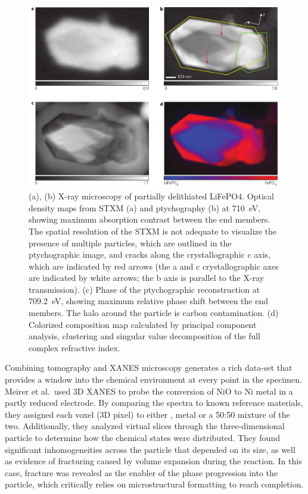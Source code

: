 \documentclass[journal=cmatex,manuscript=perspective]{achemso}
\begin{document}
\begin{figure}
  \includegraphics[width=\textwidth]{shapiro2014-2.png}
  \caption{(a), (b) X-ray microscopy of partially delithiated
    LiFePO4. Optical density maps from STXM (a) and ptychography (b)
    at \SI{710}{eV}, showing maximum absorption contrast between the end
    members. The spatial resolution of the STXM is not adequate to
    visualize the presence of multiple particles, which are outlined
    in the ptychographic image, and cracks along the crystallographic
    c axis, which are indicated by red arrows (the a and c
    crystallographic axes are indicated by white arrows; the b axis is
    parallel to the X-ray transmission). (c) Phase of the
    ptychographic reconstruction at \SI{709.2}{eV}, showing maximum relative
    phase shift between the end members. The halo around the particle
    is carbon contamination. (d) Colorized composition map calculated
    by principal component analysis, clustering and singular value
    decomposition of the full complex refractive index.\cite{shapiro2014}}
  \label{figure:shapiro2014-2}
\end{figure}

Combining tomography and XANES microscopy generates a rich data-set
that provides a window into the chemical environment at every point in
the specimen. Meirer et al.\ used 3D XANES to probe the conversion of
NiO to Ni metal in a partly reduced electrode\cite{meirer2011}. By
comparing the spectra to known reference materials, they assigned each
voxel (3D pixel) to either ,  metal or a 50:50 mixture
of the two. Additionally, they analyzed virtual slices through the
three-dimensional particle to determine how the chemical states were
distributed. They found significant inhomogeneities across the
particle that depended on its size, as well as evidence of fracturing
caused by volume expansion during the reaction. In this case, fracture
was revealed as the enabler of the phase progression into the
particle, which critically relies on microstructural formatting to
reach completion.
\end{document}

